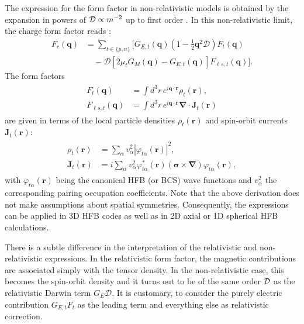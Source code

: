 \documentclass[aps,prc,twocolumn,floatfix,nofootinbib,preprintnumbers,superscriptaddress,longbibliography]{revtex4-1}
\renewcommand{\vec}{\boldsymbol}
\begin{document}
The  expression for the form factor in non-relativistic models is obtained by  the expansion in powers of ${\cal D}\propto m^{-2}$ up to first order \cite{deForest1966}.  In this non-relativistic limit, the charge form factor reads \cite{Friar1975}:
\begin{align}\label{allFF}
F_{c}(\vec{q}) &= 
\sum_{t\in\{p,n\}}
 \Big[G_{E,t}(\vec{q})
   \left(1-{\textstyle\frac{1}{2}}\vec{q}^2\mathcal{D}\right)
   F_t(\vec{q})
\nonumber \\
  &\quad
  -  \mathcal{D}\left[2\mu_t G_M(\vec{q})-G_{E,t}(\vec{q})\right]
  F_{\ell s,t}(\vec{q})\Big].
\end{align}
 The form factors
\begin{align}\label{eq:Ftls}
\begin{aligned}
  F_{t}(\vec{q})
  &=
  \int d^3r\,
  e^{{i}\vec{q}\cdot\vec{r}}\rho_t(\vec{r}),
\\
  F_{{\ell s},t}(\vec{q})
  &=
  \int d^3r\,
  e^{i\vec{q}\cdot\vec{r}}\bm{\nabla}\!\cdot\!\vec{J}_t(\vec{r})
  \end{aligned}
 \end{align}
are given in terms of the local  particle densities $\rho_t(\vec{r})$ and  spin-orbit currents
$\vec{J}_t(\vec{r})$: 
\begin{align}
\begin{aligned}
  \rho_t(\vec{r})
  &=
  \sum_\alpha v_\alpha^2 |\varphi_{t\alpha}(\vec{r})|^2,
\\
  \vec{J}_t(\vec{r})
  &=
i\sum_{\alpha}v_\alpha^2 {\varphi}_{t\alpha}^*(\vec{r})
   (\bm{\sigma}\!\times\!\bm{\nabla}){\varphi}_{t\alpha}^{\mbox{}}(\vec{r}),
  \end{aligned} 
 \end{align}  
with ${\varphi}_{t\alpha}^{\mbox{}}(\vec{r})$ being the canonical HFB (or BCS) wave functions
and  $v_\alpha^2$  the corresponding pairing occupation coefficients.
Note that the above derivation does not make assumptions about spatial
symmetries. Consequently, the expressions can be applied in  3D HFB codes as well as in 2D axial
or 1D spherical HFB calculations.

There is a subtle difference in the interpretation of the relativistic and  non-relativistic expressions.  In the relativistic form factor, the magnetic contributions are associated simply with the tensor density. 
In the non-relativistic case, this becomes the spin-orbit density and it turns out to be of the same order ${\cal D}$ as the relativistic Darwin term $G_{E}\mathcal{D}$. It is customary, to consider the purely electric contribution $G_{E,t}F_t$ as the leading term and everything else as relativistic correction.
\end{document}
